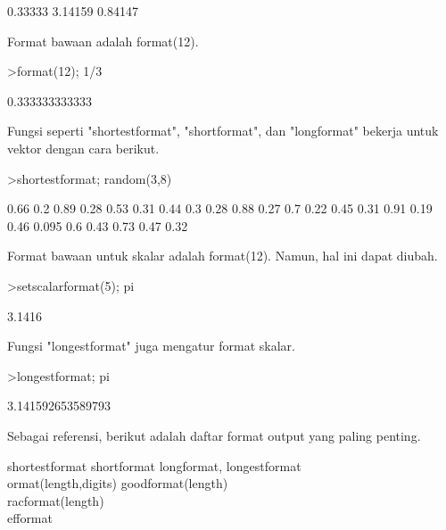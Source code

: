 \documentclass{article}
\newenvironment{eulernotebook}{\par}{\par}
\newenvironment{eulercomment}{\par\medskip}{\par\medskip}
\begin{document}
\begin{eulernotebook}
\begin{euleroutput}
      0.33333 
      3.14159 
      0.84147 
\end{euleroutput}
\begin{eulercomment}
Format bawaan adalah format(12).
\end{eulercomment}
\begin{eulerprompt}
>format(12); 1/3
\end{eulerprompt}
\begin{euleroutput}
       0.333333333333 
\end{euleroutput}
\begin{eulercomment}
Fungsi seperti "shortestformat", "shortformat", dan "longformat"
bekerja untuk vektor dengan cara berikut.
\end{eulercomment}
\begin{eulerprompt}
>shortestformat; random(3,8)
\end{eulerprompt}
\begin{euleroutput}
    0.66    0.2   0.89   0.28   0.53   0.31   0.44    0.3 
    0.28   0.88   0.27    0.7   0.22   0.45   0.31   0.91 
    0.19   0.46  0.095    0.6   0.43   0.73   0.47   0.32 
\end{euleroutput}
\begin{eulercomment}
Format bawaan untuk skalar adalah format(12). Namun, hal ini dapat
diubah.
\end{eulercomment}
\begin{eulerprompt}
>setscalarformat(5); pi
\end{eulerprompt}
\begin{euleroutput}
  3.1416
\end{euleroutput}
\begin{eulercomment}
Fungsi "longestformat" juga mengatur format skalar.
\end{eulercomment}
\begin{eulerprompt}
>longestformat; pi
\end{eulerprompt}
\begin{euleroutput}
  3.141592653589793
\end{euleroutput}
\begin{eulercomment}
Sebagai referensi, berikut adalah daftar format output yang paling
penting.

shortestformat shortformat longformat, longestformat\\
ormat(length,digits) goodformat(length)\\
racformat(length)\\
efformat


\end{eulercomment}
\end{eulernotebook}
\end{document}
